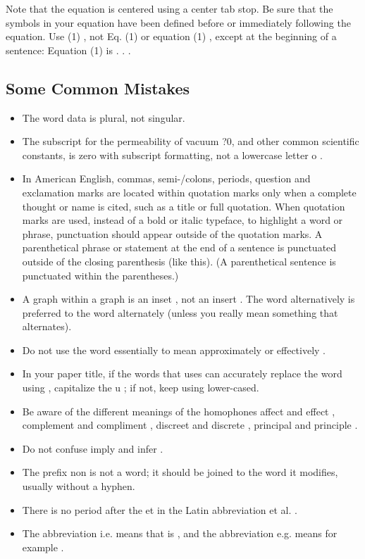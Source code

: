 \documentclass[letterpaper, 10 pt, conference]{ieeeconf}  %
\begin{document}
Note that the equation is centered using a center tab stop. Be sure that the symbols in your equation have been defined before or immediately following the equation. Use  (1) , not  Eq. (1)  or  equation (1) , except at the beginning of a sentence:  Equation (1) is . . . 

\subsection{Some Common Mistakes}
\begin{itemize}


\item The word  data  is plural, not singular.
\item The subscript for the permeability of vacuum ?0, and other common scientific constants, is zero with subscript formatting, not a lowercase letter  o .
\item In American English, commas, semi-/colons, periods, question and exclamation marks are located within quotation marks only when a complete thought or name is cited, such as a title or full quotation. When quotation marks are used, instead of a bold or italic typeface, to highlight a word or phrase, punctuation should appear outside of the quotation marks. A parenthetical phrase or statement at the end of a sentence is punctuated outside of the closing parenthesis (like this). (A parenthetical sentence is punctuated within the parentheses.)
\item A graph within a graph is an  inset , not an  insert . The word alternatively is preferred to the word  alternately  (unless you really mean something that alternates).
\item Do not use the word  essentially  to mean  approximately  or  effectively .
\item In your paper title, if the words  that uses  can accurately replace the word  using , capitalize the  u ; if not, keep using lower-cased.
\item Be aware of the different meanings of the homophones  affect  and  effect ,  complement  and  compliment ,  discreet  and  discrete ,  principal  and  principle .
\item Do not confuse  imply  and  infer .
\item The prefix  non  is not a word; it should be joined to the word it modifies, usually without a hyphen.
\item There is no period after the  et  in the Latin abbreviation  et al. .
\item The abbreviation  i.e.  means  that is , and the abbreviation  e.g.  means  for example .

\end{itemize}
\end{document}
